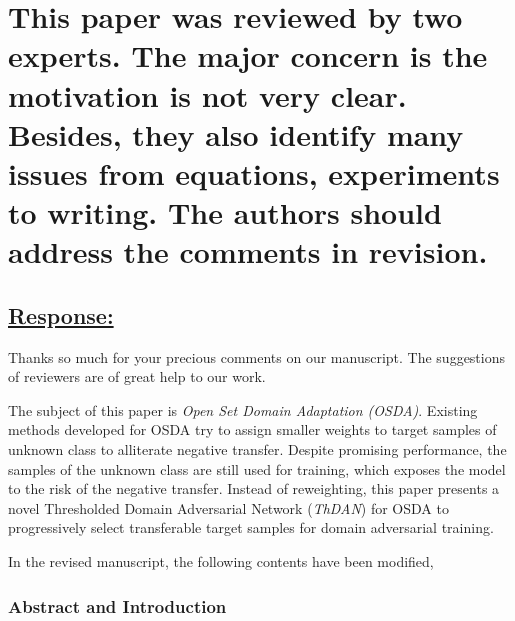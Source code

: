 \section*{This paper was reviewed by two experts. 
    The major concern is the motivation is not very clear. 
    Besides, they also identify many issues from equations, experiments to writing. 
    The authors should address the comments in revision. 
}

\subsection*{\underline{\textbf{Response:}}}

Thanks so much for your precious comments on our manuscript.
The suggestions of reviewers are of great help to our work. 

The subject of this paper is \textit{Open Set Domain Adaptation (OSDA)}.
Existing methods developed for OSDA try to assign smaller weights to target samples of unknown class to alliterate negative transfer.
Despite promising performance, the samples of the unknown class are still used for training, which exposes the model to the risk of the negative transfer.
Instead of reweighting, this paper presents a novel Thresholded Domain Adversarial Network (\textit{ThDAN}) for OSDA to progressively select transferable target samples for domain adversarial training. 

In the revised manuscript, the following contents have been modified,
\subsubsection*{{\textbf{Abstract and Introduction}}}


